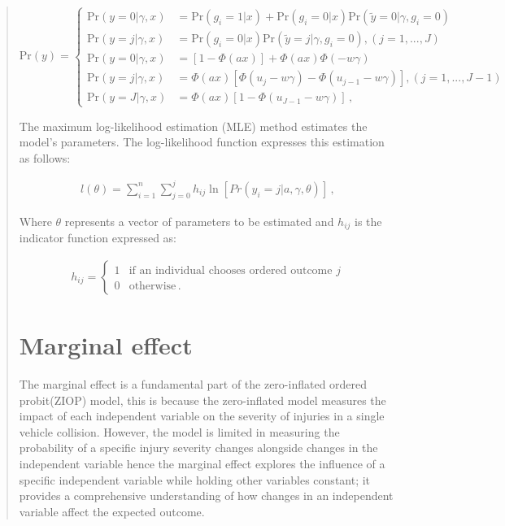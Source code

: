 \documentclass[12]{report}
\begin{document}
\begin{quote}
{\begin{fleqn}
\begin{equation}
\text{Pr}(y) = 
\begin{cases} 
\text{Pr}(y = 0 | \gamma, x) & = \text{Pr}(g_i = 1 | x) + \text{Pr}(g_i = 0 | x) \text{Pr}(\tilde{y} = 0 | \gamma, g_i = 0) \\
\text{Pr}(y = j | \gamma, x) & = \text{Pr}(g_i = 0 | x) \text{Pr}(\tilde{y} = j | \gamma, g_i = 0) ,  (j = 1, ..., J) \\
\text{Pr}(y = 0 | \gamma, x) & = [1 - \Phi(ax)] + \Phi(ax) \Phi(- w \gamma) \\
\text{Pr}(y = j | \gamma, x) & = \Phi(ax) [\Phi(u_j - w \gamma) - \Phi(u_{j-1} - w \gamma)] , (j = 1, ..., J - 1) \\
\text{Pr}(y = J | \gamma, x) & = \Phi(ax)[1 - \Phi(u_{J-1} - w \gamma)] \, ,
\end{cases} 
\tag{4.3.7}
\end{equation}
\end{fleqn}

\clearpage
The maximum log-likelihood estimation (MLE) method estimates the model's parameters. The log-likelihood function expresses this estimation as follows:
\begin{fleqn}
\begin{align*}
l(\theta) = \sum_{{i=1}}^{n} \sum_{{j=0}}^{j} h_{ij} \ln[Pr(y_i = j | a, \gamma, \theta)] \, ,
\tag{4.3.8}
\end{align*}
\end{fleqn}
Where $\theta$ represents a vector of parameters to be estimated and $h_{ij}$ is the indicator function expressed as:
\begin{fleqn}
\begin{align*}
h_{ij} =
\begin{cases} 
1 & \text{if an individual chooses ordered outcome } j \\
0 & \text{otherwise} \, .
\tag{4.3.9}
\end{cases}
\end{align*}
\end{fleqn}

 
 \section{Marginal effect}
 
The marginal effect is a fundamental part of the zero-inflated ordered probit(ZIOP) model, this is because the zero-inflated model measures the impact of each independent variable on the severity of injuries in a single vehicle collision. However, the model is limited in measuring the probability of a specific injury severity changes alongside changes in the independent variable hence the marginal effect explores the influence of  a specific independent variable while holding other variables constant; it provides a comprehensive understanding of how changes in an independent variable affect the expected outcome. 

}
\end{quote}
\end{document}
